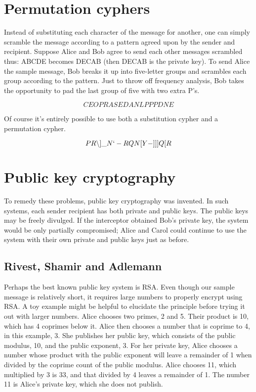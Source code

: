 \documentclass[12pt]{article}
\begin{document}
\section{Permutation cyphers}

Instead of substituting each character of the message for another, one can simply scramble the message according to a pattern agreed upon by the sender and recipient. Suppose Alice and Bob agree to send each other messages scrambled thus: ABCDE becomes DECAB (then DECAB is the private key). To send Alice the sample message, Bob breaks it up into five-letter groups and scrambles each group according to the pattern. Just to throw off frequency analysis, Bob takes the opportunity to pad the last group of five with two extra P's.

$$CEOPRAS EDANL PPPDNE$$

Of course it's entirely possible to use both a substitution cypher and a permutation cypher.


$$PR{\backslash}]\_N`-RQN[Y-]]]Q[R$$


\section{Public key cryptography}

To remedy these problems, public key cryptography was invented. In such systems, each sender recipient has both private and public keys. The public keys may be freely divulged. If the interceptor obtained Bob's private key, the system would be only partially compromised; Alice and Carol could continue to use the system with their own private and public keys just as before.

\subsection{Rivest, Shamir and Adlemann}

Perhaps the best known public key system is RSA. Even though our sample message is relatively short, it requires large numbers to properly encrypt using RSA. A toy example might be helpful to elucidate the principle before trying it out with larger numbers. Alice chooses two primes, 2 and 5. Their product is 10, which has 4 coprimes below it. Alice then chooses a number that is coprime to 4, in this example, 3. She publishes her public key, which consists of the public modulus, 10, and the public exponent, 3. For her private key, Alice chooses a number whose product with the public exponent will leave a remainder of 1 when divided by the coprime count of the public modulus. Alice chooses 11, which multiplied by 3 is 33, and that divided by 4 leaves a remainder of 1. The number 11 is Alice's private key, which she does not publish.
\end{document}
